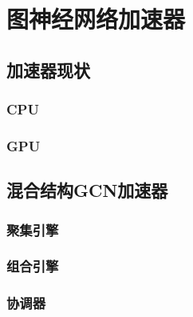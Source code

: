 
\chapter{图神经网络加速器}

\section{加速器现状}

\subsection{CPU}

\subsection{GPU}

\section{混合结构GCN加速器}

\subsection{聚集引擎}

\subsection{组合引擎}

\subsection{协调器}